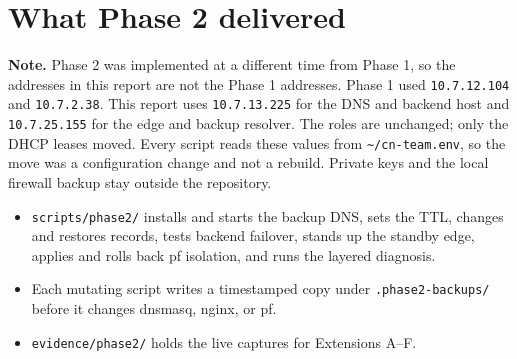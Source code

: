 \documentclass[11pt,a4paper]{article}
\begin{document}
\section{What Phase 2 delivered}
\noindent\textbf{Note.} Phase 2 was implemented at a different time from Phase 1, so the
addresses in this report are not the Phase 1 addresses. Phase 1 used
\texttt{10.7.12.104} and \texttt{10.7.2.38}. This report uses \texttt{10.7.13.225}
for the DNS and backend host and \texttt{10.7.25.155} for the edge and backup
resolver. The roles are unchanged; only the DHCP leases moved. Every script reads
these values from \texttt{\textasciitilde/cn-team.env}, so the move was a
configuration change and not a rebuild. Private keys and the local firewall backup
stay outside the repository.

\begin{itemize}
  \item \texttt{scripts/phase2/} installs and starts the backup DNS, sets the TTL, changes and restores records, tests backend failover, stands up the standby edge, applies and rolls back pf isolation, and runs the layered diagnosis.
  \item Each mutating script writes a timestamped copy under \texttt{.phase2-backups/} before it changes dnsmasq, nginx, or pf.
  \item \texttt{evidence/phase2/} holds the live captures for Extensions A--F.
\end{itemize}
\end{document}
